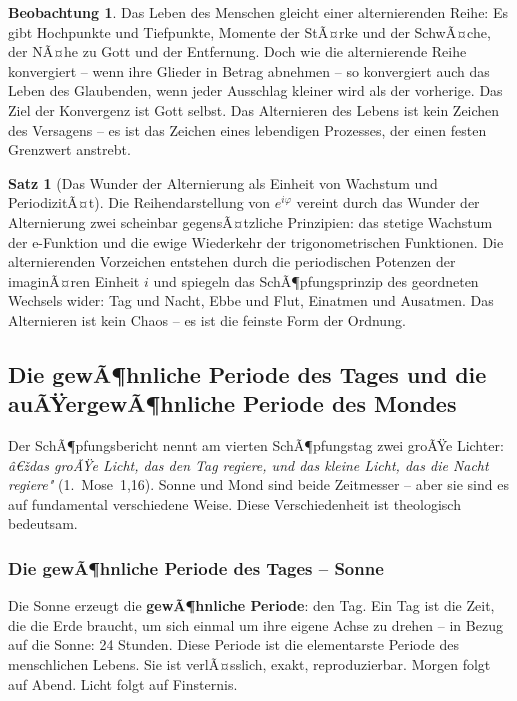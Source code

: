﻿\documentclass[a4paper,12pt]{article}
\theoremstyle{definition}
\newtheorem{theorem}{Satz}[section]
\newtheorem{observation}{Beobachtung}[section]
\begin{document}
\begin{observation}
	Das Leben des Menschen gleicht einer alternierenden Reihe: Es gibt Hochpunkte
	und Tiefpunkte, Momente der StÃ¤rke und der SchwÃ¤che, der NÃ¤he zu Gott und der
	Entfernung. Doch wie die alternierende Reihe konvergiert -- wenn ihre Glieder
	in Betrag abnehmen -- so konvergiert auch das Leben des Glaubenden, wenn jeder
	Ausschlag kleiner wird als der vorherige. Das Ziel der Konvergenz ist Gott selbst.
	Das Alternieren des Lebens ist kein Zeichen des Versagens -- es ist das Zeichen
	eines lebendigen Prozesses, der einen festen Grenzwert anstrebt.
\end{observation}

\begin{theorem}[Das Wunder der Alternierung als Einheit von Wachstum und PeriodizitÃ¤t]
	Die Reihendarstellung von $e^{i\varphi}$ vereint durch das Wunder der
	Alternierung zwei scheinbar gegensÃ¤tzliche Prinzipien: das stetige Wachstum
	der e-Funktion und die ewige Wiederkehr der trigonometrischen
	Funktionen. Die alternierenden Vorzeichen entstehen durch die periodischen
	Potenzen der imaginÃ¤ren Einheit $i$ und spiegeln das SchÃ¶pfungsprinzip des
	geordneten Wechsels wider: Tag und Nacht, Ebbe und Flut, Einatmen und Ausatmen.
	Das Alternieren ist kein Chaos -- es ist die feinste Form der Ordnung.
\end{theorem}

\subsection{Die gewÃ¶hnliche Periode des Tages und die auÃŸergewÃ¶hnliche
	Periode des Mondes}

Der SchÃ¶pfungsbericht nennt am vierten SchÃ¶pfungstag zwei groÃŸe Lichter:
\textit{â€ždas groÃŸe Licht, das den Tag regiere, und das kleine Licht, das die Nacht
	regiere"} (1.~Mose~1,16). Sonne und Mond sind beide Zeitmesser -- aber sie sind
es auf fundamental verschiedene Weise. Diese Verschiedenheit ist theologisch
bedeutsam.

\subsubsection{Die gewÃ¶hnliche Periode des Tages -- Sonne}

Die Sonne erzeugt die \textbf{gewÃ¶hnliche Periode}: den Tag. Ein Tag ist die Zeit,
die die Erde braucht, um sich einmal um ihre eigene Achse zu drehen -- in Bezug
auf die Sonne: 24 Stunden. Diese Periode ist die elementarste Periode des
menschlichen Lebens. Sie ist verlÃ¤sslich, exakt, reproduzierbar. Morgen folgt auf
Abend. Licht folgt auf Finsternis.
\end{document}
